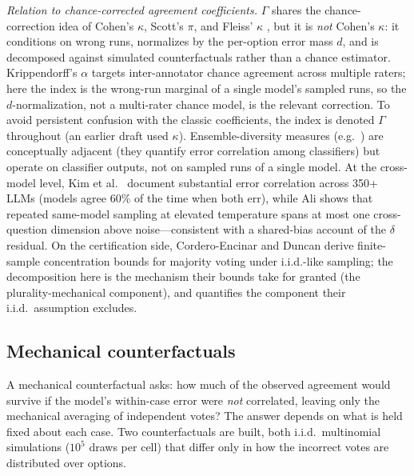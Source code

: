 \documentclass{article}
\newcommand{\agreementIndex}{\Gamma}
\begin{document}
\emph{Relation to chance-corrected agreement coefficients.}
$\agreementIndex$ shares the chance-correction idea of Cohen's $\kappa$, Scott's
$\pi$, and Fleiss' $\kappa$
\cite{cohen1960,scott1955,fleiss1971,krippendorff1970}, but it is
\emph{not} Cohen's $\kappa$: it conditions on wrong runs, normalizes by
the per-option error mass $d$, and is decomposed against simulated
counterfactuals rather than a chance estimator. Krippendorff's $\alpha$
targets inter-annotator chance agreement across multiple raters; here the
index is the wrong-run marginal of a single model's sampled runs, so the
$d$-normalization, not a multi-rater chance model, is the relevant
correction. To avoid persistent
confusion with the classic coefficients, the index is denoted $\Gamma$
throughout (an earlier draft used $\kappa$).
Ensemble-diversity measures
(e.g.\ \cite{kuncheva2003}) are
conceptually adjacent (they quantify error correlation among
classifiers) but operate on classifier outputs, not on sampled runs of a
single model. At the cross-model level, Kim et al.~\cite{kim2025correlated}
document substantial error correlation across 350+ LLMs (models agree
60\% of the time when both err), while Ali \cite{ali2026stochastic} shows
that repeated same-model sampling at elevated temperature spans at most
one cross-question dimension above noise---consistent with a
shared-bias account of the $\delta$ residual. On the certification side,
Cordero-Encinar and Duncan \cite{corderoencinar2025certified} derive
finite-sample concentration bounds for majority voting under
i.i.d.-like sampling; the decomposition here is the mechanism their
bounds take for granted (the plurality-mechanical component), and
quantifies the component their i.i.d.\ assumption excludes.

\subsection{Mechanical counterfactuals}
\label{sec:iid}

A mechanical counterfactual asks: how much of the observed agreement
would survive if the model's within-case error were \emph{not}
correlated, leaving only the mechanical averaging of independent votes?
The answer depends on what is held fixed about each case. Two counterfactuals are built, both i.i.d.\ multinomial simulations ($10^5$ draws per
cell) that differ only in how the incorrect votes are distributed over
options.
\end{document}
